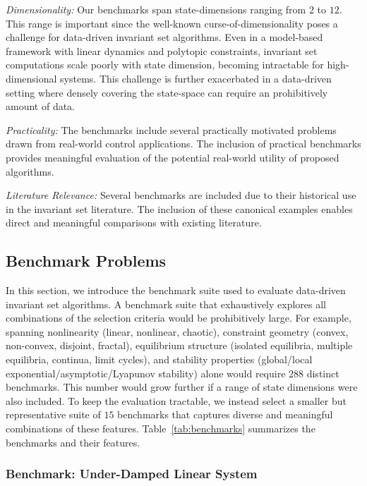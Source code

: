 \emph{Dimensionality:}
Our benchmarks span state-dimensions ranging from $2$ to $12$.
This range is important since the well-known curse-of-dimensionality poses a  challenge for data-driven invariant set algorithms. Even in a model-based framework with linear dynamics and polytopic constraints, invariant set computations scale poorly with state dimension, becoming intractable for high-dimensional systems. This challenge is further exacerbated in a data-driven setting where densely covering the state-space can require an prohibitively amount of data. 

\emph{Practicality:}
The benchmarks include several practically motivated problems drawn from real-world control applications. The inclusion of practical benchmarks provides meaningful evaluation of the potential real-world utility of proposed algorithms.

\emph{Literature Relevance:}
Several benchmarks are included due to their historical use in the invariant set literature. The inclusion of these canonical examples enables direct and meaningful comparisons with existing literature.



\subsection{Benchmark Problems}

In this section, we introduce the benchmark suite used to evaluate data-driven invariant set algorithms. A benchmark suite that exhaustively explores all combinations of the selection criteria would be prohibitively large. For example, spanning nonlinearity (linear, nonlinear, chaotic), constraint geometry (convex, non-convex, disjoint, fractal), equilibrium structure (isolated equilibria, multiple equilibria, continua, limit cycles), and stability properties (global/local exponential/asymptotic/Lyapunov stability) alone would require $288$ distinct benchmarks. This number would grow further if a range of state dimensions were also included. To keep the evaluation tractable, we instead select a smaller but representative suite of $15$ benchmarks that captures diverse and meaningful combinations of these features. Table~\ref{tab:benchmarks} summarizes the benchmarks and their features.

\subsubsection{Benchmark: Under-Damped Linear System}

